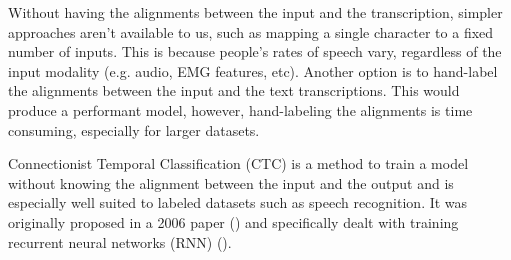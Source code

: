 Without having the alignments between the input and the transcription,
simpler approaches aren't available to us, such as mapping a single
character to a fixed number of inputs. This is because people's rates
of speech vary, regardless of the input modality (e.g. audio, EMG features,
etc). Another option is to hand-label the alignments between the input
and the text transcriptions. This would produce a performant model, however,
hand-labeling the alignments is time consuming, especially for larger datasets.

Connectionist Temporal Classification (CTC) is a method to train a model
without knowing the alignment between the input and the output and is especially
well suited to labeled datasets such as speech recognition.
It was originally proposed in a 2006 paper (\cite{ctc_original}) and specifically
dealt with training recurrent neural networks (RNN) (\cite{rnn_fundamentals}).